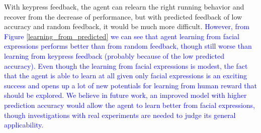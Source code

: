 


With keypress feedback, the agent can relearn the right running behavior and recover from the decrease of performance, but with predicted feedback of low accuracy and random feedback, it would be much more difficult. \textcolor{blue}{However, from Figure \ref{learning_from_predicted} we can see that agent learning from facial expressions performs better than from random feedback, though still worse than learning from %
keypress feedback (probably because of the low predicted accuracy). Even though the learning from facial expressions is modest, the fact that the agent is able to learn at all given only facial expressions %
is an exciting success and opens up a lot of new potentials for learning from human reward that should be explored. We believe in future work, an improved model with higher prediction accuracy would allow the agent to learn better from facial expressions, though investigations with real experiments are needed to judge its general applicability.}





